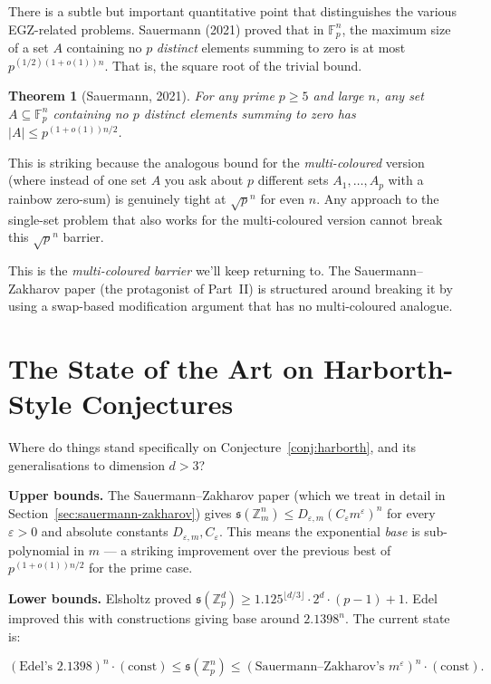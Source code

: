 \documentclass[11pt,a4paper]{article}
\theoremstyle{plain}
\newtheorem{theorem}{Theorem}[section]
\theoremstyle{definition}
\theoremstyle{remark}
\newcommand{\F}{\mathbb{F}}
\newcommand{\Z}{\mathbb{Z}}
\newcommand{\sUFp}{\mathfrak{s}}
\newcommand{\EGZ}{\textsf{EGZ}}
\begin{document}
There is a subtle but important quantitative point that distinguishes the various \EGZ-related problems. Sauermann (2021) proved that in $\F_p^n$, the maximum size of a set $A$ containing no $p$ \emph{distinct} elements summing to zero is at most $p^{(1/2)(1+o(1))n}$. That is, the square root of the trivial bound.

\begin{theorem}[Sauermann, 2021]
\label{thm:sauermann-square-root}
For any prime $p \geq 5$ and large $n$, any set $A \subseteq \F_p^n$ containing no $p$ distinct elements summing to zero has $|A| \leq p^{(1+o(1))n/2}$.
\end{theorem}

This is striking because the analogous bound for the \emph{multi-coloured} version (where instead of one set $A$ you ask about $p$ different sets $A_1, \ldots, A_p$ with a rainbow zero-sum) is genuinely tight at $\sqrt{p}^n$ for even $n$. Any approach to the single-set problem that also works for the multi-coloured version cannot break this $\sqrt{p}^n$ barrier.

This is the \emph{multi-coloured barrier} we'll keep returning to. The Sauermann--Zakharov paper (the protagonist of Part~II) is structured around breaking it by using a swap-based modification argument that has no multi-coloured analogue.

\section{The State of the Art on Harborth-Style Conjectures}

Where do things stand specifically on Conjecture~\ref{conj:harborth}, and its generalisations to dimension $d > 3$?

\textbf{Upper bounds.} The Sauermann--Zakharov paper (which we treat in detail in Section~\ref{sec:sauermann-zakharov}) gives $\sUFp(\Z_m^n) \leq D_{\varepsilon, m} (C_\varepsilon m^\varepsilon)^n$ for every $\varepsilon > 0$ and absolute constants $D_{\varepsilon, m}, C_\varepsilon$. This means the exponential \emph{base} is sub-polynomial in $m$ --- a striking improvement over the previous best of $p^{(1+o(1))n/2}$ for the prime case.

\textbf{Lower bounds.} Elsholtz proved $\sUFp(\Z_p^d) \geq 1.125^{\lfloor d/3 \rfloor} \cdot 2^d \cdot (p - 1) + 1$. Edel improved this with constructions giving base around $2.1398^n$. The current state is:

\begin{equation}
(\text{Edel's } 2.1398)^n \cdot (\text{const}) \leq \sUFp(\Z_p^n) \leq (\text{Sauermann--Zakharov's } m^\varepsilon)^n \cdot (\text{const}).
\end{equation}
\end{document}
